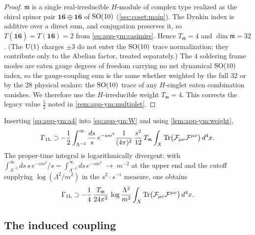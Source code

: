 \begin{proof}
$\mathfrak m$ is a single real-irreducible $H$-module of complex type
realized as the chiral spinor pair $\mathbf{16}\oplus
\overline{\mathbf{16}}$ of $\mathrm{SO}(10)$
(\autoref{sec:coset:main}). The Dynkin index is additive over a
direct sum, and conjugation preserves it, so
$T(\overline{\mathbf{16}})=T(\mathbf{16})=2$ from
\eqref{eq:app-ym:casimirs}. Hence $T_{\mathfrak m}=4$ and
$\dim\mathfrak m=32$. (The $\mathrm{U}(1)$ charges $\pm3$ do not enter the
$\mathrm{SO}(10)$ trace normalization; they contribute only to the Abelian
factor, treated separately.) The $4$ soldering frame modes are eaten
gauge degrees of freedom carrying no net dynamical $\mathrm{SO}(10)$ index, so the
gauge-coupling sum is the same whether weighted by the full $32$ or by
the $28$ physical scalars: the $\mathrm{SO}(10)$ trace of any $H$-singlet eaten
combination vanishes. We therefore use the $H$-irreducible weight
$T_{\mathfrak m}=4$. This corrects the legacy value $\tfrac52$ noted in
\autoref{rem:app-ym:multiplet}.
\end{proof}

Inserting \eqref{eq:app-ym:a4} into \eqref{eq:app-ym:W} and using
\autoref{lem:app-ym:weight},
\begin{equation}\label{eq:app-ym:insert}
  \Gamma_{\mathrm{1L}}
  \supset
  -\frac12\int_{\Lambda^{-2}}^{\infty}\frac{ds}{s}\,e^{-sm^{2}}
   \frac{1}{(4\pi)^{2}}\,\frac{s^{2}}{12}\,T_{\mathfrak m}
   \int_{X}\operatorname{Tr}\bigl(\mathcal F_{\mu\nu}\mathcal F^{\mu\nu}\bigr)\,d^{4}x .
\end{equation}
The proper-time integral is logarithmically divergent: with
$\int_{\Lambda^{-2}}^{\infty}ds\,s\,e^{-sm^{2}}/s
=\int_{\Lambda^{-2}}^{\infty}ds\,e^{-sm^{2}}
\;\to\;m^{-2}$ at the upper end and the cutoff supplying
$\log(\Lambda^{2}/m^{2})$ in the $s^{2}\!\cdot s^{-1}$ measure, one
obtains
\begin{equation}\label{eq:app-ym:log}
  \Gamma_{\mathrm{1L}}
  \supset
  -\frac14\,\frac{T_{\mathfrak m}}{24\pi^{2}}\,
   \log\frac{\Lambda^{2}}{m^{2}}
   \int_{X}\operatorname{Tr}\bigl(\mathcal F_{\mu\nu}\mathcal F^{\mu\nu}\bigr)\,d^{4}x .
\end{equation}

\subsection{The induced coupling}
\label{sec:app-ym:coupling}

